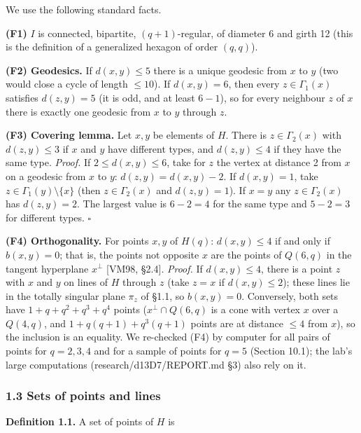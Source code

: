 \documentclass[
  11pt,
]{article}
\begin{document}
We use the following standard facts.

\textbf{(F1)} \(I\) is connected, bipartite, \((q+1)\)-regular, of diameter 6 and girth 12 (this is the definition of a
generalized hexagon of order \((q,q)\)).

\textbf{(F2) Geodesics.} If \(d(x,y)\le 5\) there is a unique geodesic from \(x\) to \(y\) (two would close a cycle of
length \(\le 10\)). If \(d(x,y) = 6\), then every \(z\in\Gamma_1(x)\) satisfies \(d(z,y) = 5\) (it is odd, and at least
\(6-1\)), so for every neighbour \(z\) of \(x\) there is exactly one geodesic from \(x\) to \(y\) through \(z\).

\textbf{(F3) Covering lemma.} Let \(x, y\) be elements of \(H\). There is \(z\in\Gamma_2(x)\) with \(d(z,y)\le 3\) if
\(x\) and \(y\) have different types, and \(d(z,y)\le 4\) if they have the same type. \emph{Proof.} If
\(2\le d(x,y)\le 6\), take for \(z\) the vertex at distance 2 from \(x\) on a geodesic from \(x\) to \(y\):
\(d(z,y) = d(x,y)-2\). If \(d(x,y) = 1\), take \(z\in\Gamma_1(y)\setminus\{x\}\) (then \(z\in\Gamma_2(x)\) and
\(d(z,y) = 1\)). If \(x = y\) any \(z\in\Gamma_2(x)\) has \(d(z,y) = 2\). The largest value is \(6-2 = 4\) for the same
type and \(5-2 = 3\) for different types. \(\square\)

\textbf{(F4) Orthogonality.} For points \(x, y\) of \(H(q)\): \(d(x,y)\le 4\) if and only if \(b(x,y) = 0\); that is,
the points not opposite \(x\) are the points of \(Q(6,q)\) in the tangent hyperplane \(x^\perp\) {[}VM98, §2.4{]}.
\emph{Proof.} If \(d(x,y)\le 4\), there is a point \(z\) with \(x\) and \(y\) on lines of \(H\) through \(z\) (take
\(z = x\) if \(d(x,y)\le 2\)); these lines lie in the totally singular plane \(\pi_z\) of §1.1, so \(b(x,y) = 0\).
Conversely, both sets have \(1+q+q^2+q^3+q^4\) points (\(x^\perp\cap Q(6,q)\) is a cone with vertex \(x\) over a
\(Q(4,q)\), and \(1 + q(q+1) + q^3(q+1)\) points are at distance \(\le 4\) from \(x\)), so the inclusion is an equality.
We re-checked (F4) by computer for all pairs of points for \(q = 2, 3, 4\) and for a sample of points for \(q = 5\)
(Section 10.1); the lab's large computations (research/d13D7/REPORT.md §3) also rely on it.

\hypertarget{sets-of-points-and-lines}{%
\subsubsection{1.3 Sets of points and lines}\label{sets-of-points-and-lines}}

\textbf{Definition 1.1.} A set of points of \(H\) is
\end{document}
